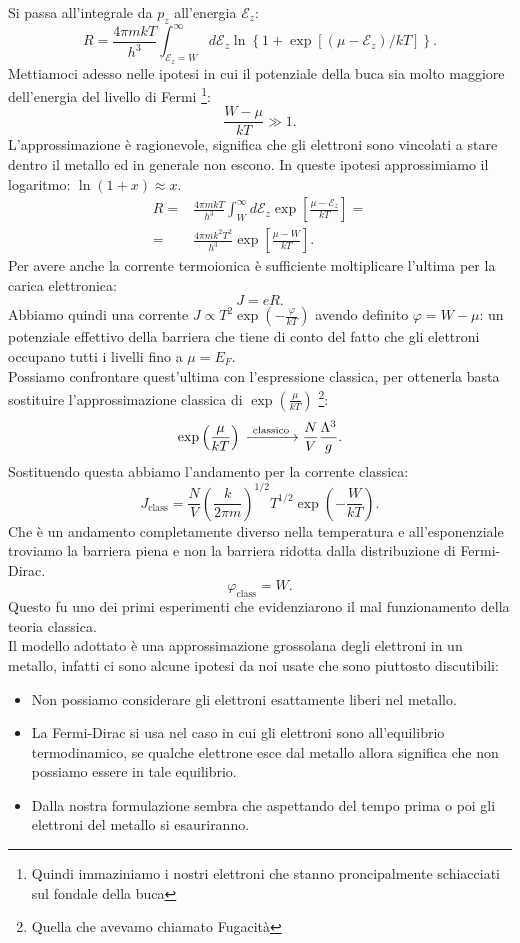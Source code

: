 Si passa all'integrale da $p_{z}$ all'energia $\mathcal{E} _{z}$:
\[
	R = \frac{4\pi m kT}{h^3} \int_{\mathcal{E}_{z}=W}^{\infty} d\mathcal{E} _{z} \ln\left\{ 1+\exp\left[ \left( \mu -\mathcal{E} _{z} \right) /kT \right]  \right\}  
.\] 
Mettiamoci adesso nelle ipotesi in cui il potenziale della buca sia molto maggiore dell'energia del livello di Fermi \footnote{Quindi immaziniamo i nostri elettroni che stanno proncipalmente schiacciati sul fondale della buca}:
\[
	\frac{W-\mu }{kT} \gg 1
.\] 
L'approssimazione è ragionevole, significa che gli elettroni sono vincolati a stare dentro il metallo ed in generale non escono. In queste ipotesi approssimiamo il logaritmo: $\ln( 1+x) \approx x$.
\begin{align}
	R =& \frac{4\pi m kT}{h^3}\int_{W}^{\infty} d\mathcal{E}_{z} \exp\left[ \frac{\mu -\mathcal{E}_{z}}{kT} \right] = \\
	=&\frac{4\pi m k^2T^2}{h^3}\exp\left[ \frac{\mu -W}{kT} \right] 
.\end{align}
Per avere anche la corrente termoionica è sufficiente moltiplicare l'ultima per la carica elettronica:
\[
	J = eR
.\] 
Abbiamo quindi una corrente $J \propto T^2 \exp\left(-\frac{\varphi}{kT} \right)$ avendo definito $\varphi = W - \mu$: un potenziale effettivo della barriera che tiene di conto del fatto che gli elettroni occupano tutti i livelli fino a $\mu = E_{F}$. \\
Possiamo confrontare quest'ultima con l'espressione classica, per ottenerla basta sostituire l'approssimazione classica di $\exp\left( \frac{\mu }{kT} \right)$ \footnote{Quella che avevamo chiamato Fugacità}:
\[
	\exp\left( \frac{\mu }{kT} \right) \ce{ ->[\text{ classico }] } \frac{N}{V}\frac{\Lambda ^3}{g}
.\] 
Sostituendo questa abbiamo l'andamento per la corrente classica:
\[
	J_\text{class}= \frac{N}{V}\left( \frac{k}{2\pi m} \right) ^{1 /2} T ^{1 /2} \exp\left( - \frac{W}{kT} \right) 
.\] 
Che è un andamento completamente diverso nella temperatura e all'esponenziale troviamo la barriera piena e non la barriera ridotta dalla distribuzione di Fermi-Dirac.
\[
	\varphi_{\text{class}} = W
.\] 
Questo fu uno dei primi esperimenti che evidenziarono il mal funzionamento della teoria classica.\\
Il modello adottato è una approssimazione grossolana degli elettroni in un metallo, infatti ci sono alcune ipotesi da noi usate che sono piuttosto discutibili:
\begin{itemize}
	\item Non possiamo considerare gli elettroni esattamente liberi nel metallo.
	\item La Fermi-Dirac si usa nel caso in cui gli elettroni sono all'equilibrio termodinamico, se qualche elettrone esce dal metallo allora significa che non possiamo essere in tale equilibrio.
	\item Dalla nostra formulazione sembra che aspettando del tempo prima o poi gli elettroni del metallo si esauriranno.
\end{itemize}

